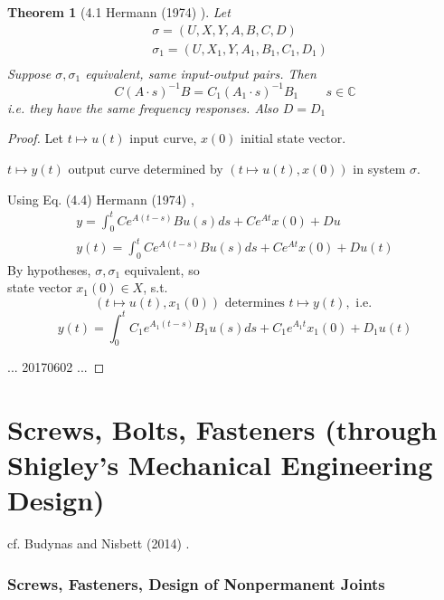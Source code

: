 \documentclass[10pt]{amsart}
\newtheorem{theorem}{Theorem}
\begin{document}
\begin{multicols*}{2}
\begin{theorem}[4.1 Hermann (1974) \cite{Herm1974}]
Let 
\[
\begin{aligned}
&	\sigma = (U,X,Y,A,B,C,D) \\ 
&	\sigma_1 = (U,X_1,Y,A_1,B_1,C_1,D_1) \\ 
\end{aligned}
\]
Suppose $\sigma,\sigma_1$ equivalent, same input-output pairs.  Then
\begin{equation}
	C(A\cdot s)^{-1}B = C_1(A_1\cdot s)^{-1}B_1 \qquad \, s \in \mathbb{C}
\end{equation}
i.e. they have the same frequency responses.  Also $D=D_1$
\end{theorem}

\begin{proof}
Let $t \mapsto u(t)$ input curve, $x(0)$ initial state vector.  

$t\mapsto y(t)$ output curve determined by $(t\mapsto u(t), x(0))$ in system $\sigma$.  

Using Eq. (4.4) Hermann (1974) \cite{Herm1974}, 
\begin{equation}
\begin{gathered}
	y = \int_0^t Ce^{A(t-s) } Bu(s) ds + Ce^{At} x(0) + Du \\ 
y(t) = \int_0^t Ce^{A(t-s)} Bu(s) ds + Ce^{At } x(0) + Du(t) 
\end{gathered}
\end{equation}
By hypotheses, $\sigma,\sigma_1$ equivalent, so  \\

state vector $x_1(0) \in X$, s.t.
\[
(t\mapsto u(t), x_1(0)) \text{ determines } t\mapsto y(t), \text{ i.e. } 
\]
\[
y(t) = \int_0^t C_1 e^{A_1(t-s) } B_1u(s) ds + C_1 e^{A_1t } x_1(0) + D_1u(t)
\]

... 20170602 ...

\end{proof}


\part{Screws, Bolts, Fasteners (through Shigley's Mechanical Engineering Design)}

cf. Budynas and Nisbett (2014) \cite{BuNi2014}.  

\section{Screws, Fasteners, Design of Nonpermanent Joints}


\end{multicols*}
\end{document}
